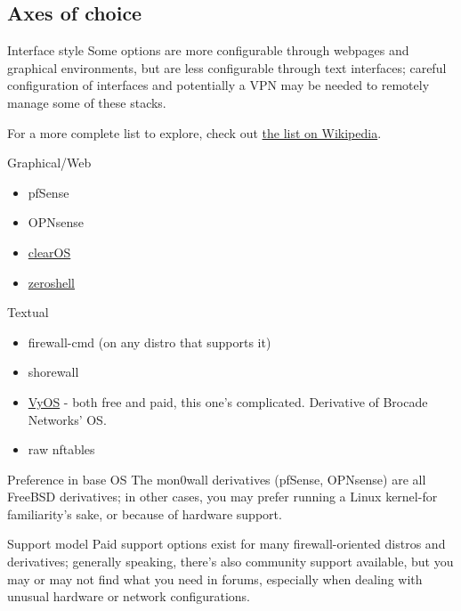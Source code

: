 \documentclass[bigger]{beamer}
\begin{document}
\subsection{Axes of choice}
\label{sec:org84da425}

\begin{frame}[label={sec:orgb205e75}]{Interface style}
Some options are more configurable through webpages and graphical
environments, but are less configurable through text interfaces; careful
configuration of interfaces and potentially a VPN may be needed to remotely
manage some of these stacks.

For a more complete list to explore, check out \href{https://en.wikipedia.org/wiki/List\_of\_router\_and\_firewall\_distributions}{the list on Wikipedia}.

\begin{block}{Graphical/Web}
\begin{itemize}
\item pfSense
\item OPNsense
\item \href{https://www.clearos.com/}{clearOS}
\item \href{https://zeroshell.org/}{zeroshell}
\end{itemize}
\end{block}

\begin{block}{Textual}
\begin{itemize}
\item firewall-cmd (on any distro that supports it)
\item shorewall
\item \href{https://www.vyos.io/}{VyOS} - both free and paid, this one's complicated. Derivative of Brocade
Networks' OS.
\item raw nftables
\end{itemize}
\end{block}
\end{frame}

\begin{frame}[label={sec:orgdb902ba}]{Preference in base OS}
The mon0wall derivatives (pfSense, OPNsense) are all FreeBSD derivatives; in
other cases, you may prefer running a Linux kernel-for familiarity's sake,
or because of hardware support.
\end{frame}

\begin{frame}[label={sec:org991cbe7}]{Support model}
Paid support options exist for many firewall-oriented distros and
derivatives; generally speaking, there's also community support available,
but you may or may not find what you need in forums, especially when dealing
with unusual hardware or network configurations.
\end{frame}
\end{document}
